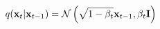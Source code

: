 \documentclass[preview]{standalone}
\begin{document}
\begin{align*}
\special{dvisvgm:raw <g id='unique000'>}q(\mathbf{x}_t|\mathbf{x}_{t-1})=\mathcal{N}\left(\sqrt{1-\beta_t}\mathbf{x}_{t-1},\beta_t\mathbf{I}\right)\special{dvisvgm:raw </g>}
\end{align*}
\end{document}
